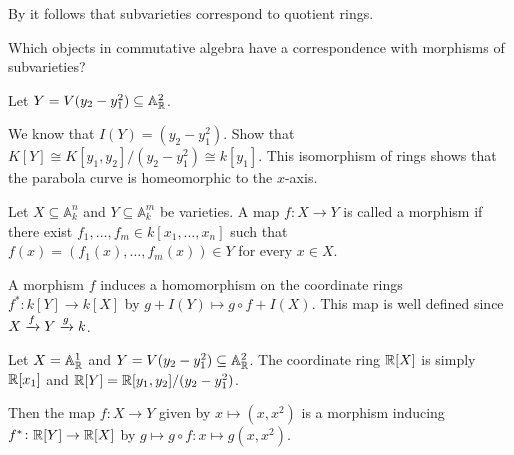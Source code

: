 \documentclass[11pt,a4paper]{article}
\newcommand{\A}{\mathbb A}
\begin{document}
\begin{remark}
  By 
  it follows that subvarieties correspond to quotient rings.
\end{remark}

\begin{question}
  Which objects in commutative algebra
  have a correspondence with morphisms of subvarieties?
\end{question}

\begin{exercise}
  Let $Y = V(y_2 - y_1^2) \subseteq \A_{\R}^2$.
    \begin{center}
    \end{center}
  We know that $I(Y) = (y_2 - y_1^2)$.
  Show that $K[Y] \cong K[y_1,y_2]/(y_2 - y_1^2) \cong k[y_1]$.
  This isomorphism of rings shows that the parabola curve
  is homeomorphic to the $x$-axis.
\end{exercise}

\begin{definition}
  Let $X \subseteq \A_k^n$ and $Y \subseteq \A_k^m$ be varieties.
  A map $f \colon X \to Y$ is called a morphism if there exist
  $f_1,\dots,f_m \in k[x_1,\dots,x_n]$ such that $f(x) = (f_1(x),\dots,f_m(x)) \in Y$
  for every $x \in X$.
\end{definition}

\begin{definition}
  A morphism $f$ induces a homomorphism on the coordinate rings
  $f^* \colon k[Y] \to k[X]$ by $g + I(Y) \mapsto g \circ f + I(X)$.
  This map is well defined since $X \xrightarrow{f} Y \xrightarrow{g} k$.
\end{definition}

\begin{example}
  Let $X = \A_{\R}^1$ and $Y = V(y_2 - y_1^2) \subseteq \A_{\R}^2$.
  The coordinate ring $\mathbb{R}[X]$ is simply $\mathbb{R}[x_1]$
  and $\mathbb{R}[Y] = \mathbb{R}[y_1,y_2] / (y_2 - y_1^2)$.

  Then the map $f \colon X \to Y$ given by $x \mapsto (x,x^2)$
  is a morphism inducing $f^* \colon \mathbb{R}[Y] \to \mathbb{R}[X]$
  by $g \mapsto g \circ f \colon x \mapsto g(x,x^2)$.
\end{example}
\end{document}
